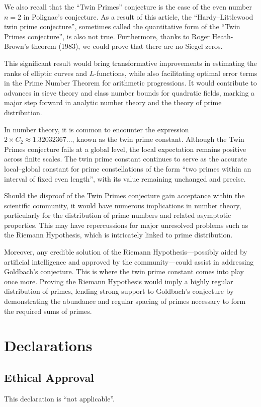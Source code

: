 \documentclass[11pt]{article}
\begin{document}
We also recall that the ``Twin Primes'' conjecture is the case of the even number $n=2$ in Polignac's conjecture. As a result of this article, the ``Hardy--Littlewood twin prime conjecture'', sometimes called the quantitative form of the ``Twin Primes conjecture'', is also not true. Furthermore, thanks to Roger Heath-Brown's theorem (1983), we could prove that there are no Siegel zeros.

This significant result would bring transformative improvements in estimating the ranks of elliptic curves and $L$-functions, while also facilitating optimal error terms in the Prime Number Theorem for arithmetic progressions. It would contribute to advances in sieve theory and class number bounds for quadratic fields, marking a major step forward in analytic number theory and the theory of prime distribution.

In number theory, it is common to encounter the expression $2 \times C_2 \approx 1.32032367\ldots$, known as the twin prime constant. Although the Twin Primes conjecture fails at a global level, the local expectation remains positive across finite scales. The twin prime constant continues to serve as the accurate local--global constant for prime constellations of the form ``two primes within an interval of fixed even length'', with its value remaining unchanged and precise.

Should the disproof of the Twin Primes conjecture gain acceptance within the scientific community, it would have numerous implications in number theory, particularly for the distribution of prime numbers and related asymptotic properties. This may have repercussions for major unresolved problems such as the Riemann Hypothesis, which is intricately linked to prime distribution.

Moreover, any credible solution of the Riemann Hypothesis---possibly aided by artificial intelligence and approved by the community---could assist in addressing Goldbach's conjecture. This is where the twin prime constant comes into play once more. Proving the Riemann Hypothesis would imply a highly regular distribution of primes, lending strong support to Goldbach's conjecture by demonstrating the abundance and regular spacing of primes necessary to form the required sums of primes.


\section*{Declarations}

\subsection*{Ethical Approval}
This declaration is ``not applicable''.
\end{document}
